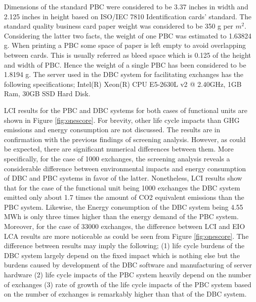 \documentclass[conference]{IEEEtran}
\begin{document}
Dimensions of the standard PBC were considered to be 3.37 inches in width and 2.125 inches in height based on ISO/IEC 7810 Identification cards' standard.  The standard quality business card paper weight was considered to be 350 g per $m^2$. Considering the latter two facts, the weight of one PBC was estimated to 1.63824 g. When printing a PBC some space of paper is left empty to avoid overlapping between cards. This is usually referred as bleed space which is 0.125 of the height and width of PBC. Hence the weight of a single PBC has been considered to be 1.8194 g. The server used in the DBC system for facilitating exchanges has the following specifications; Intel(R) Xeon(R) CPU E5-2630L v2 @ 2.40GHz, 1GB Ram, 30GB SSD Hard Disk.

LCI results for the PBC and DBC systems for both cases of functional units are shown in Figure \ref{fig:onescore}. For brevity, other life cycle impacts than GHG emissions and energy consumption are not discussed. The results are in confirmation with the previous findings of screening analysis. However, as could be expected, there are significant numerical differences between them. More specifically, for the case of 1000 exchanges, the screening analysis reveals a considerable difference between environmental impacts and energy consumption of DBC and PBC systems in favor of the latter. Nonetheless, LCI results show that for the case of the functional unit being 1000 exchanges the DBC system emitted only about 1.7 times the amount of CO2 equivalent emissions than the PBC system. Likewise, the Energy consumption of the DBC system being 4.55 MWh is only three times higher than the energy demand of the PBC system. Moreover, for the case of 33000 exchanges, the difference between LCI and EIO LCA results are more noticeable as could be seen from Figure \ref{fig:onescore}. The difference between results may imply the following; (1) life cycle burdens of the DBC system largely depend on the fixed impact which is nothing else but the burdens caused by development of the DBC software and manufacturing of server hardware (2) life cycle impacts of the PBC system heavily depend on the number of exchanges (3) rate of growth of the life cycle impacts of the PBC system based on the number of exchanges is remarkably higher than that of the DBC system.
\end{document}
